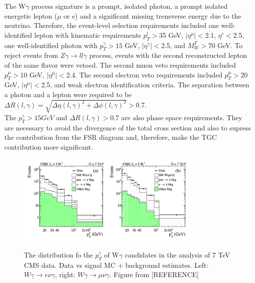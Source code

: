 The W$\gamma$ process signature is a prompt, isolated photon, a prompt isolated energetic lepton ($\mu$ or e) and a significant missing trensverse energy due to the neutrino. Therefore, the event-level selection requirements included one well-identified lepton with kinematic requirements $p_T^l>$35 GeV, $|\eta^\mu|<$2.1, $\eta^e<$2.5, one well-identified photon with $p_T^\gamma>15$ GeV, $|\eta^\gamma|<$2.5, and $M_W^T>$70 GeV. To reject events from $Z\gamma\rightarrow ll\gamma$ process, events with the second reconstructed lepton of the same flavor were vetoed. The second muon veto requirements included $p_T^\mu>$10 GeV, $|\eta^\mu|<$2.4. The second electron veto requirements included $p_T^\mu>$20 GeV, $|\eta^\mu|<$2.5, and weak electron identification criteria. The separation between a photon and a lepton were required to be $\Delta R(l,\gamma) = \sqrt{\Delta \eta(l,\gamma)^2 + \Delta \phi(l,\gamma)^2}>$0.7.\\  

The $p_T^\gamma>15 GeV$ and  $\Delta R(l,\gamma)>$0.7 are also phase space requirements. They are necessary to avoid the divergence of the total cross section and also to supress the contribution from the FSR diagram and, therefore, make the TGC contribution more significant.\\





 \begin{figure}[htb]
  \begin{center}
    {\includegraphics[width=0.80\textwidth]{../figs/WgAbout/Wg7TeV_CMS_ptGamma.png}}
    \caption{The distribution fo the $p_T^\gamma$ of W$\gamma$ candidates in the analysis of 7 TeV CMS data. Data vs signal MC + background estimates. Left: $W\gamma\rightarrow e\nu\gamma$, right: $W\gamma\rightarrow \mu\nu\gamma$. Figure from [REFERENCE]}
    \label{fig:Wg7TeV_CMS_ptGamma}
  \end{center}
\end{figure}



